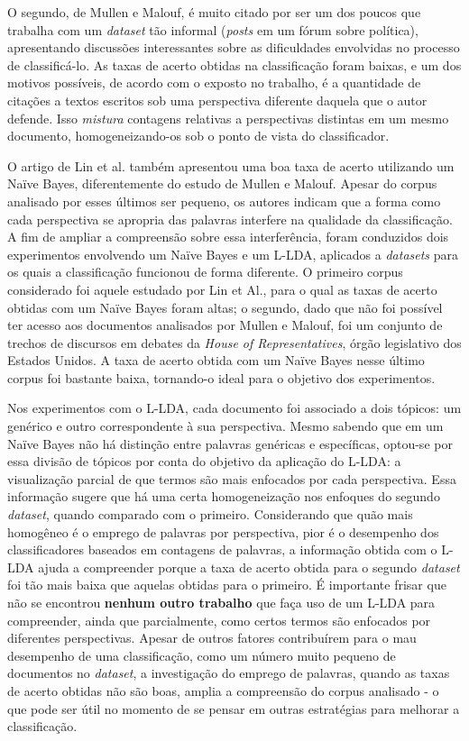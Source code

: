 O segundo, de Mullen e Malouf, é muito citado por ser um dos poucos que trabalha com um \emph{dataset} tão informal (\emph{posts} em um fórum sobre política), apresentando discussões interessantes sobre as dificuldades envolvidas no processo de classificá-lo. As taxas de acerto obtidas na classificação foram baixas, e um dos motivos possíveis, de acordo com o exposto no trabalho, é a quantidade de citações a textos escritos sob uma perspectiva diferente daquela que o autor defende. Isso \emph{mistura} contagens relativas a perspectivas distintas em um mesmo documento, homogeneizando-os sob o ponto de vista do classificador. 

O artigo de Lin et al. também apresentou uma boa taxa de acerto utilizando um Naïve Bayes, diferentemente do estudo de Mullen e Malouf. Apesar do corpus analisado por esses últimos ser pequeno, os autores indicam que a forma como cada perspectiva se apropria das palavras interfere na qualidade da classificação.  A fim de ampliar a compreensão sobre essa interferência, foram conduzidos dois experimentos envolvendo um Naïve Bayes e um L-LDA, aplicados a \emph{datasets} para os quais a classificação funcionou de forma diferente. O primeiro corpus considerado foi aquele estudado por Lin et Al., para o qual as taxas de acerto obtidas com um Naïve Bayes foram altas; o segundo, dado que não foi possível ter acesso aos documentos analisados por Mullen e Malouf, foi um conjunto de trechos de discursos em debates da \emph{House of Representatives}, órgão legislativo dos Estados Unidos. A taxa de acerto obtida com um Naïve Bayes nesse último corpus foi bastante baixa, tornando-o ideal para o objetivo dos experimentos. 

Nos experimentos com o L-LDA, cada documento foi associado a dois tópicos: um genérico e outro correspondente à sua perspectiva. Mesmo sabendo que em um Naïve Bayes não há distinção entre palavras genéricas e específicas, optou-se por essa divisão de tópicos por conta do objetivo da aplicação do L-LDA: a visualização parcial de que termos são mais enfocados por cada perspectiva. Essa informação sugere que há uma certa homogeneização nos enfoques do segundo \emph{dataset}, quando comparado com o primeiro. Considerando que quão mais homogêneo é o emprego de palavras por perspectiva, pior é o desempenho dos classificadores baseados em contagens de palavras, a informação obtida com o L-LDA ajuda a compreender porque a taxa de acerto obtida para o segundo \emph{dataset} foi tão mais baixa que aquelas obtidas para o primeiro. É importante frisar que não se encontrou \textbf{nenhum outro trabalho} que faça uso de um L-LDA para compreender, ainda que parcialmente, como certos termos são enfocados por diferentes perspectivas. Apesar de outros fatores contribuírem para o mau desempenho de uma classificação, como um número muito pequeno de documentos no \emph{dataset}, a investigação do emprego de palavras, quando as taxas de acerto obtidas não são boas, amplia a compreensão do corpus analisado - o que pode ser útil no momento de se pensar em outras estratégias para melhorar a classificação.  

